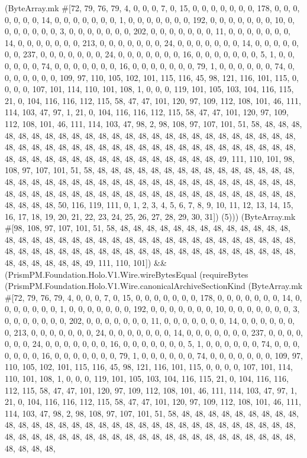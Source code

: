 \documentclass[11pt]{article}
\begin{document}
(ByteArray.mk \#[72, 79, 76, 79, 4, 0, 0, 0, 7, 0, 15, 0, 0, 0, 0, 0, 0, 0, 178, 0, 0, 0, 0, 0, 0, 0, 14, 0, 0, 0, 0, 0, 0, 0, 1, 0, 0, 0, 0, 0, 0, 0, 192, 0, 0, 0, 0, 0, 0, 0, 10, 0, 0, 0, 0, 0, 0, 0, 3, 0, 0, 0, 0, 0, 0, 0, 202, 0, 0, 0, 0, 0, 0, 0, 11, 0, 0, 0, 0, 0, 0, 0, 14, 0, 0, 0, 0, 0, 0, 0, 213, 0, 0, 0, 0, 0, 0, 0, 24, 0, 0, 0, 0, 0, 0, 0, 14, 0, 0, 0, 0, 0, 0, 0, 237, 0, 0, 0, 0, 0, 0, 0, 24, 0, 0, 0, 0, 0, 0, 0, 16, 0, 0, 0, 0, 0, 0, 0, 5, 1, 0, 0, 0, 0, 0, 0, 74, 0, 0, 0, 0, 0, 0, 0, 16, 0, 0, 0, 0, 0, 0, 0, 79, 1, 0, 0, 0, 0, 0, 0, 74, 0, 0, 0, 0, 0, 0, 0, 109, 97, 110, 105, 102, 101, 115, 116, 45, 98, 121, 116, 101, 115, 0, 0, 0, 0, 107, 101, 114, 110, 101, 108, 1, 0, 0, 0, 119, 101, 105, 103, 104, 116, 115, 21, 0, 104, 116, 116, 112, 115, 58, 47, 47, 101, 120, 97, 109, 112, 108, 101, 46, 111, 114, 103, 47, 97, 1, 21, 0, 104, 116, 116, 112, 115, 58, 47, 47, 101, 120, 97, 109, 112, 108, 101, 46, 111, 114, 103, 47, 98, 2, 98, 108, 97, 107, 101, 51, 58, 48, 48, 48, 48, 48, 48, 48, 48, 48, 48, 48, 48, 48, 48, 48, 48, 48, 48, 48, 48, 48, 48, 48, 48, 48, 48, 48, 48, 48, 48, 48, 48, 48, 48, 48, 48, 48, 48, 48, 48, 48, 48, 48, 48, 48, 48, 48, 48, 48, 48, 48, 48, 48, 48, 48, 48, 48, 48, 48, 48, 48, 48, 48, 49, 111, 110, 101, 98, 108, 97, 107, 101, 51, 58, 48, 48, 48, 48, 48, 48, 48, 48, 48, 48, 48, 48, 48, 48, 48, 48, 48, 48, 48, 48, 48, 48, 48, 48, 48, 48, 48, 48, 48, 48, 48, 48, 48, 48, 48, 48, 48, 48, 48, 48, 48, 48, 48, 48, 48, 48, 48, 48, 48, 48, 48, 48, 48, 48, 48, 48, 48, 48, 48, 48, 48, 48, 48, 50, 116, 119, 111, 0, 1, 2, 3, 4, 5, 6, 7, 8, 9, 10, 11, 12, 13, 14, 15, 16, 17, 18, 19, 20, 21, 22, 23, 24, 25, 26, 27, 28, 29, 30, 31]) (5))) (ByteArray.mk \#[98, 108, 97, 107, 101, 51, 58, 48, 48, 48, 48, 48, 48, 48, 48, 48, 48, 48, 48, 48, 48, 48, 48, 48, 48, 48, 48, 48, 48, 48, 48, 48, 48, 48, 48, 48, 48, 48, 48, 48, 48, 48, 48, 48, 48, 48, 48, 48, 48, 48, 48, 48, 48, 48, 48, 48, 48, 48, 48, 48, 48, 48, 48, 48, 48, 48, 48, 48, 48, 48, 49, 111, 110, 101]) \&\& (PrismPM.Foundation.Holo.V1.Wire.wireBytesEqual (requireBytes (PrismPM.Foundation.Holo.V1.Wire.canonicalArchiveSectionKind (ByteArray.mk \#[72, 79, 76, 79, 4, 0, 0, 0, 7, 0, 15, 0, 0, 0, 0, 0, 0, 0, 178, 0, 0, 0, 0, 0, 0, 0, 14, 0, 0, 0, 0, 0, 0, 0, 1, 0, 0, 0, 0, 0, 0, 0, 192, 0, 0, 0, 0, 0, 0, 0, 10, 0, 0, 0, 0, 0, 0, 0, 3, 0, 0, 0, 0, 0, 0, 0, 202, 0, 0, 0, 0, 0, 0, 0, 11, 0, 0, 0, 0, 0, 0, 0, 14, 0, 0, 0, 0, 0, 0, 0, 213, 0, 0, 0, 0, 0, 0, 0, 24, 0, 0, 0, 0, 0, 0, 0, 14, 0, 0, 0, 0, 0, 0, 0, 237, 0, 0, 0, 0, 0, 0, 0, 24, 0, 0, 0, 0, 0, 0, 0, 16, 0, 0, 0, 0, 0, 0, 0, 5, 1, 0, 0, 0, 0, 0, 0, 74, 0, 0, 0, 0, 0, 0, 0, 16, 0, 0, 0, 0, 0, 0, 0, 79, 1, 0, 0, 0, 0, 0, 0, 74, 0, 0, 0, 0, 0, 0, 0, 109, 97, 110, 105, 102, 101, 115, 116, 45, 98, 121, 116, 101, 115, 0, 0, 0, 0, 107, 101, 114, 110, 101, 108, 1, 0, 0, 0, 119, 101, 105, 103, 104, 116, 115, 21, 0, 104, 116, 116, 112, 115, 58, 47, 47, 101, 120, 97, 109, 112, 108, 101, 46, 111, 114, 103, 47, 97, 1, 21, 0, 104, 116, 116, 112, 115, 58, 47, 47, 101, 120, 97, 109, 112, 108, 101, 46, 111, 114, 103, 47, 98, 2, 98, 108, 97, 107, 101, 51, 58, 48, 48, 48, 48, 48, 48, 48, 48, 48, 48, 48, 48, 48, 48, 48, 48, 48, 48, 48, 48, 48, 48, 48, 48, 48, 48, 48, 48, 48, 48, 48, 48, 48, 48, 48, 48, 48, 48, 48, 48, 48, 48, 48, 48, 48, 48, 48, 48, 48, 48, 48, 48, 48, 48, 48, 48, 48, 
\end{document}

